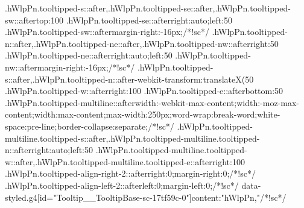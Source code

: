 {{{{{{{{{{{{{{{{{{{{.hWlpPn.tooltipped-s::after,.hWlpPn.tooltipped-se::after,.hWlpPn.tooltipped-sw::after{top:100%
.hWlpPn.tooltipped-se::after{right:auto;left:50%
.hWlpPn.tooltipped-sw::after{margin-right:-16px;}/*!sc*/
.hWlpPn.tooltipped-n::after,.hWlpPn.tooltipped-ne::after,.hWlpPn.tooltipped-nw::after{right:50%
.hWlpPn.tooltipped-ne::after{right:auto;left:50%
.hWlpPn.tooltipped-nw::after{margin-right:-16px;}/*!sc*/
.hWlpPn.tooltipped-s::after,.hWlpPn.tooltipped-n::after{-webkit-transform:translateX(50%
.hWlpPn.tooltipped-w::after{right:100%
.hWlpPn.tooltipped-e::after{bottom:50%
.hWlpPn.tooltipped-multiline::after{width:-webkit-max-content;width:-moz-max-content;width:max-content;max-width:250px;word-wrap:break-word;white-space:pre-line;border-collapse:separate;}/*!sc*/
.hWlpPn.tooltipped-multiline.tooltipped-s::after,.hWlpPn.tooltipped-multiline.tooltipped-n::after{right:auto;left:50%
.hWlpPn.tooltipped-multiline.tooltipped-w::after,.hWlpPn.tooltipped-multiline.tooltipped-e::after{right:100%
.hWlpPn.tooltipped-align-right-2::after{right:0;margin-right:0;}/*!sc*/
.hWlpPn.tooltipped-align-left-2::after{left:0;margin-left:0;}/*!sc*/
data-styled.g4[id="Tooltip__TooltipBase-sc-17tf59c-0"]{content:"hWlpPn,"}/*!sc*/
}}}}}}}}}}}}}}}}}}}}}}}}}}}}}
